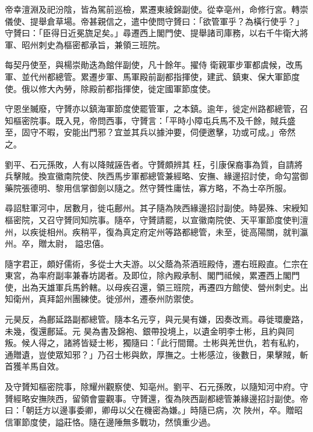 \begin{pinyinscope}
 帝幸澶淵及祀汾陰，皆為駕前巡檢，累遷東綾錦副使。從幸亳州，命修行宮。轉崇儀使、提舉倉草場。帝甚親信之，遣中使問守贇曰：「欲管軍乎？為橫行使乎？」守贇曰：「臣得日近冕旒足矣。」尋遷西上閣門使、提舉諸司庫務，以右千牛衛大將軍、昭州刺史為樞密都承旨，兼領三班院。



 每契丹使至，與楊崇勛迭為館伴副使，凡十餘年。擢侍
 衛親軍步軍都虞候，改馬軍、並代州都總管。累遷步軍、馬軍殿前副都指揮使，建武、鎮東、保大軍節度使。俄以修大內勞，除殿前都指揮使，徙定國軍節度使。



 守恩坐贓廢，守贇亦以鎮海軍節度使罷管軍，之本鎮。逾年，徙定州路都總管，召知樞密院事。既入見，帝問西事，守贇言：「平時小障屯兵馬不及千餘，賊兵盛至，固守不暇，安能出門邪？宜並其兵以據沖要，伺便邀擊，功或可成。」帝然之。



 劉平、石元孫敗，人有以降賊誣告者。守贇頗辨其
 枉，引康保裔事為質，自請將兵擊賊。換宣徽南院使、陜西馬步軍都總管兼經略、安撫、緣邊招討使，命勾當御藥院張德明、黎用信掌御劍以隨之。然守贇性庸怯，寡方略，不為士卒所服。



 尋詔駐軍河中，居數月，徙屯鄜州。其子隨為陜西緣邊招討副使。時晏殊、宋綬知樞密院，又召守贇同知院事。隨卒，守贇請罷，以宣徽南院使、天平軍節度使判澶州，以疾徙相州。疾稍平，復為真定府定州等路都總管，未至，徙高陽關，就判瀛州。卒，贈太尉，
 謚忠僖。



 隨字君正，頗好儒術，多從士大夫游。以父蔭為茶酒班殿侍，遷右班殿直。仁宗在東宮，為率府副率兼春坊謁者。及即位，除內殿承制、閣門祗候，累遷西上閣門使，出為天雄軍兵馬鈐轄。以母疾召還，領三班院，再遷四方館使、營州刺史。出知衛州，真拜韶州團練使。徙邠州，遷泰州防禦使。



 元昊反，為鄜延路副都總管。隨本名元亨，與元昊有嫌，因奏改焉。尋徙環慶路，未幾，復還鄜延。元
 昊為書及錦袍、銀帶投境上，以遺金明李士彬，且約與同叛。候人得之，諸將皆疑士彬，獨隨曰：「此行間爾。士彬與羌世仇，若有私約，通贈遺，豈使眾知邪？」乃召士彬與飲，厚撫之。士彬感泣，後數日，果擊賊，斬首獲羊馬自效。



 及守贇知樞密院事，除耀州觀察使、知亳州。劉平、石元孫敗，以隨知河中府。守贇經略安撫陜西，留領會靈觀事。守贇還，復為陜西副都總管兼緣邊招討副使。帝曰：「朝廷方以邊事委卿，卿毋以父在機密為嫌。」時隨已病，次
 陜州，卒。贈昭信軍節度使，謚莊恪。隨在邊陲無多戰功，然慎重少過。




\end{pinyinscope}
